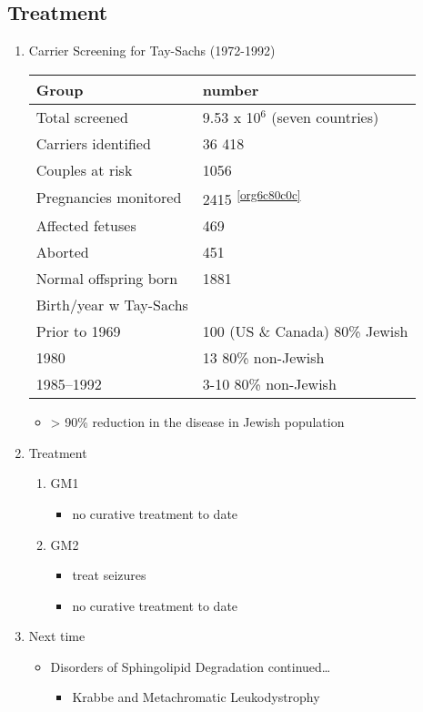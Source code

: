 \documentclass{scrartcl}
\begin{document}
\subsection{Treatment}
\label{sec:org3bcab6e}
\begin{enumerate}
\item Carrier Screening for Tay-Sachs (1972-1992)
\label{sec:orgea5d217}


\begin{center}
\begin{tabular}{ll}
Group & number\\
\hline
Total screened & 9.53 x 10\(^{\text{6}}\) (seven countries)\\
Carriers identified & 36 418\\
Couples at risk & 1056\\
Pregnancies monitored & 2415 \textsuperscript{\ref{org6c80c0c}}\\
Affected fetuses & 469\\
Aborted & 451\\
Normal offspring born & 1881\\
Birth/year w Tay-Sachs & \\
Prior to 1969 & 100 (US \& Canada) 80\% Jewish\\
1980 & 13 80\% non-Jewish\\
1985–1992 & 3-10 80\% non-Jewish\\
\end{tabular}
\end{center}

\begin{itemize}
\item > 90\% reduction in the disease in Jewish population
\end{itemize}

\item Treatment
\label{sec:org34b9276}

\begin{enumerate}
\item GM1
\label{sec:org547a6b7}
\begin{itemize}
\item no curative treatment to date
\end{itemize}
\item GM2
\label{sec:orgdd76e59}
\begin{itemize}
\item treat seizures
\item no curative treatment to date
\end{itemize}
\end{enumerate}


\item Next time
\label{sec:org5e945a6}

\begin{itemize}
\item Disorders of Sphingolipid Degradation continued\ldots{}
\begin{itemize}
\item Krabbe and Metachromatic Leukodystrophy
\end{itemize}
\end{itemize}
\end{enumerate}
\end{document}
